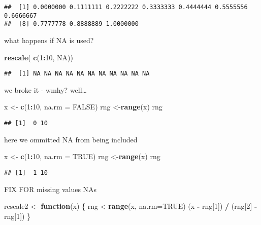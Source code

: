 \documentclass[]{article}
\newenvironment{Shaded}{\begin{snugshade}}{\end{snugshade}}
\newcommand{\ControlFlowTok}[1]{\textcolor[rgb]{0.13,0.29,0.53}{\textbf{#1}}}
\newcommand{\DataTypeTok}[1]{\textcolor[rgb]{0.13,0.29,0.53}{#1}}
\newcommand{\DecValTok}[1]{\textcolor[rgb]{0.00,0.00,0.81}{#1}}
\newcommand{\KeywordTok}[1]{\textcolor[rgb]{0.13,0.29,0.53}{\textbf{#1}}}
\newcommand{\NormalTok}[1]{#1}
\newcommand{\OperatorTok}[1]{\textcolor[rgb]{0.81,0.36,0.00}{\textbf{#1}}}
\newcommand{\OtherTok}[1]{\textcolor[rgb]{0.56,0.35,0.01}{#1}}
\newcommand{\StringTok}[1]{\textcolor[rgb]{0.31,0.60,0.02}{#1}}
\begin{document}
\begin{verbatim}
##  [1] 0.0000000 0.1111111 0.2222222 0.3333333 0.4444444 0.5555556 0.6666667
##  [8] 0.7777778 0.8888889 1.0000000
\end{verbatim}

what happens if NA is used?

\begin{Shaded}
\begin{Highlighting}[]
\KeywordTok{rescale}\NormalTok{( }\KeywordTok{c}\NormalTok{(}\DecValTok{1}\OperatorTok{:}\DecValTok{10}\NormalTok{, }\OtherTok{NA}\NormalTok{))}
\end{Highlighting}
\end{Shaded}

\begin{verbatim}
##  [1] NA NA NA NA NA NA NA NA NA NA NA
\end{verbatim}

we broke it - wmhy? well\ldots{}

\begin{Shaded}
\begin{Highlighting}[]
\NormalTok{x <-}\StringTok{ }\KeywordTok{c}\NormalTok{(}\DecValTok{1}\OperatorTok{:}\DecValTok{10}\NormalTok{, }\DataTypeTok{na.rm =} \OtherTok{FALSE}\NormalTok{)}
\NormalTok{ rng <-}\KeywordTok{range}\NormalTok{(x)}
\NormalTok{ rng}
\end{Highlighting}
\end{Shaded}

\begin{verbatim}
## [1]  0 10
\end{verbatim}

here we ommitted NA from being included

\begin{Shaded}
\begin{Highlighting}[]
\NormalTok{x <-}\StringTok{ }\KeywordTok{c}\NormalTok{(}\DecValTok{1}\OperatorTok{:}\DecValTok{10}\NormalTok{, }\DataTypeTok{na.rm =} \OtherTok{TRUE}\NormalTok{)}
\NormalTok{ rng <-}\KeywordTok{range}\NormalTok{(x)}
\NormalTok{ rng}
\end{Highlighting}
\end{Shaded}

\begin{verbatim}
## [1]  1 10
\end{verbatim}

FIX FOR missing values NAs

\begin{Shaded}
\begin{Highlighting}[]
\NormalTok{rescale2 <-}\StringTok{ }\ControlFlowTok{function}\NormalTok{(x) \{}
\NormalTok{ rng <-}\KeywordTok{range}\NormalTok{(x, }\DataTypeTok{na.rm=}\OtherTok{TRUE}\NormalTok{)}
\NormalTok{ (x }\OperatorTok{-}\StringTok{ }\NormalTok{rng[}\DecValTok{1}\NormalTok{]) }\OperatorTok{/}\StringTok{ }\NormalTok{(rng[}\DecValTok{2}\NormalTok{] }\OperatorTok{-}\StringTok{ }\NormalTok{rng[}\DecValTok{1}\NormalTok{])}
\NormalTok{\}}
\end{Highlighting}
\end{Shaded}
\end{document}
